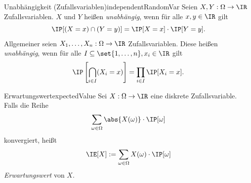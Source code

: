 \documentclass[language=ngerman,algolist]{TemplateLecture}
\begin{document}
\begin{defi}{Unabhängigkeit (Zufallsvariablen)}{independentRandomVar}
    Seien $X, Y: \Omega \to \IR$ Zufallsvariablen. $X$ und $Y$ heißen \emph{unabhängig}, wenn für alle $x,y \in \IR$ gilt
    \begin{equation*}
        \IP[(X = x) \cap (Y = y)] = \IP[X = x] \cdot \IP[Y = y].
    \end{equation*}
    Allgemeiner seien $X_1, \ldots, X_n : \Omega \to \IR$ Zufallsvariablen. Diese heißen \emph{unabhängig}, wenn für alle $I \subseteq \set{1,\ldots,n}, x_i \in \IR$ gilt 
    \begin{equation*}
        \IP\left[ \bigcap_{i \in I} (X_i = x) \right] = \prod_{i \in I} \IP[X_i = x].
    \end{equation*}
\end{defi}

\begin{defi}{Erwartungswert}{expectedValue}
    Sei $X: \Omega \to \IR$ eine diskrete Zufallsvariable. Falls die Reihe 
    \begin{equation*}
        \sum_{\omega\in \Omega} \abs{X(\omega)} \cdot \IP[\omega]
    \end{equation*}
    konvergiert, heißt 
    \begin{equation*}
        \IE[X] := \sum_{\omega \in \Omega} X(\omega) \cdot \IP[\omega]
    \end{equation*}
    \emph{Erwartungswert} von $X$.
\end{defi}

\end{document}
